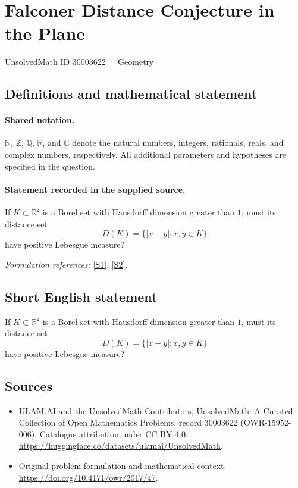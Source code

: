 \documentclass[11pt]{article}
\newcommand{\sref}[2]{\hyperlink{source:#1:#2}{[S#2]}}
\begin{document}
\setcounter{section}{30003621}
\section{Falconer Distance Conjecture in the Plane}\label{30003622}
{\small UnsolvedMath ID 30003622 · Geometry}
\subsection{Definitions and mathematical statement}

\paragraph{Shared notation.}$\mathbb N$, $\mathbb Z$, $\mathbb Q$, $\mathbb R$, and $\mathbb C$ denote the natural numbers, integers, rationals, reals, and complex numbers, respectively. All additional parameters and hypotheses are specified in the question.


\paragraph{Statement recorded in the supplied source.}
If $K\subset\mathbb R^2$ is a Borel set with Hausdorff dimension greater than $1$, must its distance set $$D(K)=\{|x-y|:x,y\in K\}$$ have positive Lebesgue measure?
\par\smallskip\textit{Formulation references:} \sref{30003622}{1}, \sref{30003622}{2}.
\subsection{Short English statement}
If $K\subset\mathbb R^2$ is a Borel set with Hausdorff dimension greater than $1$, must its distance set $$D(K)=\{|x-y|:x,y\in K\}$$ have positive Lebesgue measure?
\subsection{Sources}
\begin{itemize}
\item[\hypertarget{source:30003622:1}{S1}] ULAM.AI and the UnsolvedMath Contributors, UnsolvedMath: A Curated Collection of Open Mathematics Problems, record 30003622 (OWR-15952-006). Catalogue attribution under CC BY 4.0.
\url{https://huggingface.co/datasets/ulamai/UnsolvedMath}.
\item[\hypertarget{source:30003622:2}{S2}] Original problem formulation and mathematical context.
\url{https://doi.org/10.4171/owr/2017/47}.
\end{itemize}
\label{end:30003622}
\end{document}
